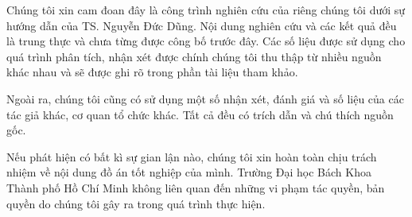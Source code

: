 \begin{declaration}
Chúng tôi xin cam đoan đây là công trình nghiên cứu của riêng chúng tôi dưới sự hướng dẫn của TS. Nguyễn Đức Dũng. Nội dung nghiên cứu và các kết quả đều là trung thực và chưa từng được công bố trước đây. Các số liệu được sử dụng cho quá trình phân tích, nhận xét được chính chúng tôi thu thập từ nhiều nguồn khác nhau và sẽ được ghi rõ trong phần tài liệu tham khảo.

Ngoài ra, chúng tôi cũng có sử dụng một số nhận xét, đánh giá và số liệu của các tác giả khác, cơ quan tổ chức khác. Tất cả  đều có trích dẫn và chú thích nguồn gốc.

Nếu phát hiện có bất kì sự gian lận nào, chúng tôi xin hoàn toàn chịu trách nhiệm về nội dung đồ án tốt nghiệp của mình. Trường Đại học Bách Khoa Thành phố Hồ Chí Minh không liên quan đến những vi phạm tác quyền, bản quyền do chúng tôi gây ra trong quá trình thực hiện.

\end{declaration}